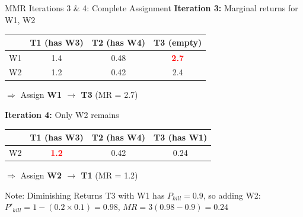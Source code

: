 \documentclass[aspectratio=43,8pt]{beamer}
\begin{document}
\begin{frame}{MMR Iterations 3 \& 4: Complete Assignment}
\textbf{Iteration 3:} Marginal returns for W1, W2

\begin{table}[h]
\centering
\begin{tabular}{c|ccc}
\toprule
     & T1 (has W3) & T2 (has W4) & T3 (empty) \\ \midrule
W1 & 1.4 & 0.48 & \textcolor{red}{\textbf{2.7}} \\
W2 & 1.2 & 0.42 & 2.4 \\
\bottomrule
\end{tabular}
\end{table}

$\Rightarrow$ Assign \textbf{W1 $\rightarrow$ T3} (MR = 2.7)

\vspace{0.3cm}
\textbf{Iteration 4:} Only W2 remains

\begin{table}[h]
\centering
\begin{tabular}{c|ccc}
\toprule
     & T1 (has W3) & T2 (has W4) & T3 (has W1) \\ \midrule
W2 & \textcolor{red}{\textbf{1.2}} & 0.42 & 0.24 \\
\bottomrule
\end{tabular}
\end{table}

$\Rightarrow$ Assign \textbf{W2 $\rightarrow$ T1} (MR = 1.2)

\begin{exampleblock}{Note: Diminishing Returns}
T3 with W1 has $P_{kill} = 0.9$, so adding W2: $P'_{kill} = 1-(0.2 \times 0.1) = 0.98$, $MR = 3(0.98-0.9) = 0.24$
\end{exampleblock}
\end{frame}
\end{document}
